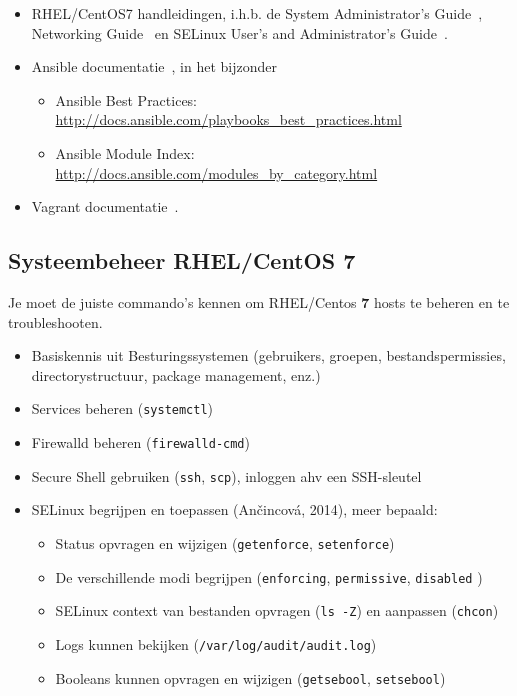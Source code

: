 \begin{itemize}
  \item RHEL/CentOS7 handleidingen, i.h.b. de System Administrator's Guide~\autocite{SvistunovEtAl2016}, Networking Guide~\autocite{JahodaEtAl2016} en SELinux User's and Administrator's Guide~\autocite{JahodaEtAl2016a}.
\item Ansible documentatie~\autocite{Ansible2016}, in het bijzonder

  \begin{itemize}
  \item Ansible Best Practices: \url{http://docs.ansible.com/playbooks_best_practices.html}
  \item Ansible Module Index: \url{http://docs.ansible.com/modules_by_category.html}
  \end{itemize}
\item Vagrant documentatie~\autocite{Hashicorp}.
\end{itemize}

\subsection{Systeembeheer RHEL/CentOS 7}
\label{systeembeheer-rhelcentos-7}

Je moet de juiste commando's kennen om RHEL/Centos \textbf{7} hosts te
beheren en te troubleshooten.

\begin{itemize}
\item Basiskennis uit Besturingssystemen (gebruikers, groepen, bestandspermissies, directorystructuur, package management, enz.)
\item Services beheren (\texttt{systemctl})
\item Firewalld beheren (\texttt{firewalld-cmd})
\item Secure Shell gebruiken (\texttt{ssh}, \texttt{scp}), inloggen ahv een SSH-sleutel
\item SELinux begrijpen en toepassen (Ančincová, 2014), meer bepaald:

  \begin{itemize}
  \item Status opvragen en wijzigen (\texttt{getenforce}, \texttt{setenforce})
  \item De verschillende modi begrijpen (\texttt{enforcing}, \texttt{permissive}, \texttt{disabled} )
  \item SELinux context van bestanden opvragen (\texttt{ls\ -Z}) en aanpassen (\texttt{chcon})
  \item Logs kunnen bekijken (\texttt{/var/log/audit/audit.log})
  \item Booleans kunnen opvragen en wijzigen (\texttt{getsebool}, \texttt{setsebool})
  \end{itemize}
\end{itemize}

